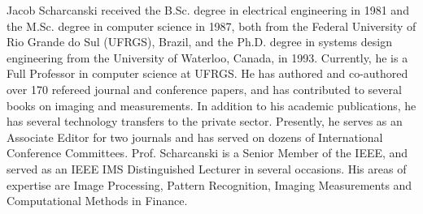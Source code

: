 \documentclass{ieeeaccess}
\begin{document}

\begin{IEEEbiography}
{Jacob Scharcanski}
received the B.Sc. degree in electrical engineering in 1981 and the M.Sc.
degree in computer science in 1987, both from the Federal University of Rio
Grande do Sul (UFRGS), Brazil, and the Ph.D. degree in systems design
engineering from the University of Waterloo, Canada, in 1993. Currently, he
is a Full Professor in computer science at UFRGS.  He has authored and
co-authored over 170 refereed journal and conference papers, and has
contributed to several books on imaging and measurements. In addition to his
academic publications, he has several technology transfers to the private
sector. Presently, he serves as an Associate Editor for two journals and has
served on dozens of International Conference Committees. Prof. Scharcanski is
a Senior Member of the IEEE, and served as an IEEE IMS Distinguished Lecturer
in several occasions. His areas of expertise are Image Processing, Pattern
Recognition, Imaging Measurements and Computational Methods in Finance.
\end{IEEEbiography}

\EOD
\end{document}
